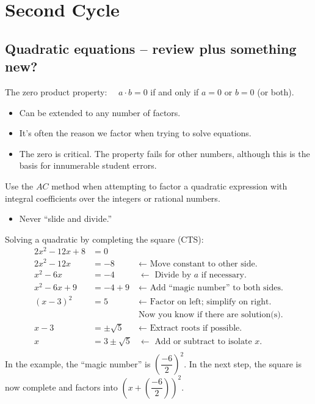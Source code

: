 \documentclass{amsbook}
\numberwithin{section}{chapter}
\numberwithin{equation}{chapter}
\newcommand{\qi}[1]{\begin{itemize}\item #1 \end{itemize}}
\begin{document}
\chapter{Second Cycle}

\section{Quadratic equations -- review plus something new?}
The zero product property: \ \ $a\cdot b = 0$ if and only if $a=0$ or $b=0$ (or both).
\begin{itemize}
\item Can be extended to any number of factors.
\item It's often the reason we factor when trying to solve equations.
\item The zero is critical. The property fails for other numbers, although this is the basis for innumerable student errors.
\end{itemize}

 Use the $AC$ method when attempting to factor a quadratic expression with integral coefficients over the integers or rational numbers.
	
	\qi{Never ``slide and divide.''}

Solving a quadratic by completing the square (CTS):
\begin{align*}
	2x^2-12x+8&=0&\\
	2x^2-12x&=-8 &\leftarrow \text{ Move constant to other side.}\\
	x^2-6x&=-4 &\leftarrow \text{ Divide by $a$ if necessary.}\\
	x^2-6x+9&=-4+9 &\leftarrow \text{ Add ``magic number'' to both sides.}\\
	(x-3)^2&=5 &\leftarrow \text{ Factor on left; simplify on right.}\\
	 & &\text{Now you know if there are solution(s).}\\
	x-3&=\pm\sqrt{5} &\leftarrow \text{ Extract roots if possible.}\\
	x&=3\pm\sqrt{5} &\leftarrow \text{ Add or subtract to isolate $x$.}\\
\end{align*}
In the example, the ``magic number'' is $\left(\dfrac{-6}{2}\right)^2$. In the next step, the square is now complete and factors into $\left( x+ \left(\dfrac{-6}{2}\right)\right)^2$.
\end{document}
